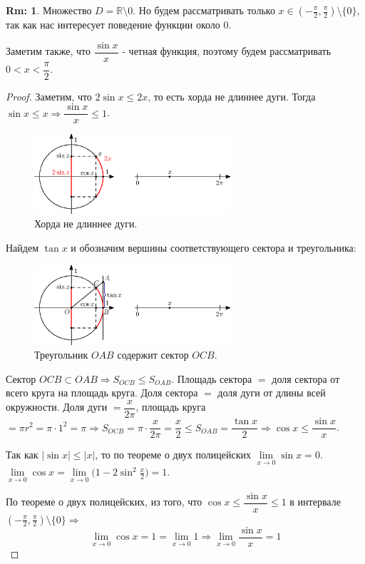 \documentclass[12pt]{article}
\theoremstyle{definition}
\newtheorem{rem}{Rm:}
\begin{document}
\begin{rem}
	Множество $D = \mathbb{R} \setminus 0$. Но будем рассматривать только $x \in (-\frac{\pi}{2}, \frac{\pi}{2}) \setminus \{0\}$, так как нас интересует поведение функции около $0$.
	
	Заметим также, что $\dfrac{\sin{x}}{x}$ - четная функция, поэтому будем рассматривать $0 < x < \dfrac{\pi}{2}$.
\end{rem}
\begin{proof}
	
Заметим, что $2 \sin{x} \leq 2x$, то есть хорда не длиннее дуги. Тогда $\sin{x} \leq x \Rightarrow \dfrac{\sin{x}}{x} \leq 1$.
\begin{figure}[H]
	\centering
	\includegraphics[width=0.65\textwidth]{15_3.eps}
	\caption{Хорда не длиннее дуги.}
	\label{15_3}
\end{figure}

Найдем $\tan{x}$ и обозначим вершины соответствующего сектора и треугольника:

\begin{figure}[H]
	\centering
	\includegraphics[width=0.65\textwidth]{15_4.eps}
	\caption{Треугольник $OAB$ содержит сектор $OCB$.}
	\label{15_4}
\end{figure}

Сектор $OCB \subset OAB \Rightarrow S_{OCB} \leq S_{OAB}$. Площадь сектора $=$ доля сектора от всего круга на площадь круга. Доля сектора $=$ доля дуги от длины всей окружности. Доля дуги $= \dfrac{x}{2\pi}$, площадь круга $= \pi r^2 = \pi\cdot 1^2 = \pi \Rightarrow S_{OCB} = \pi\cdot \dfrac{x}{2\pi} = \dfrac{x}{2} \leq S_{OAB} = \dfrac{\tan{x}}{2} \Rightarrow \cos{x} \leq \dfrac{\sin{x}}{x}$. 

Так как $|\sin{x}| \leq |x|$, то по теореме о двух полицейских $\lim\limits_{x\to 0} \sin{x} = 0$. $\lim\limits_{x \to 0}\cos{x} = \lim\limits_{x \to 0}\Big(1 - 2 \sin^2{\frac{x}{2}}\Big) = 1$.

По теореме о двух полицейских, из того, что $\cos{x} \leq \dfrac{\sin{x}}{x} \leq 1$ в интервале $(-\frac{\pi}{2}, \frac{\pi}{2}) \setminus \{0\}\Rightarrow$ 
$$\lim\limits_{x \to 0} \cos{x} = 1 = \lim\limits_{x \to 0} 1 \Rightarrow \lim\limits_{x \to 0}\dfrac{\sin{x}}{x} = 1$$
\end{proof}
\end{document}
